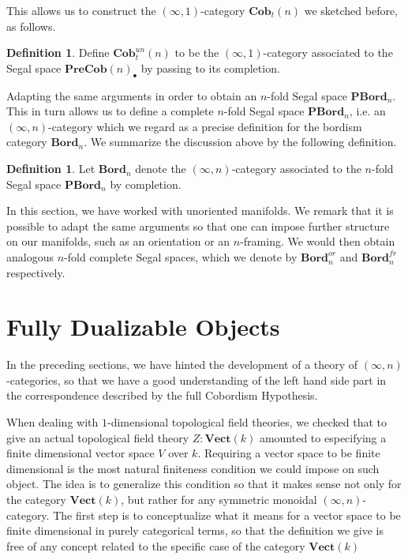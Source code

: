\documentclass[a4paper,11pt]{article}
\newcommand{\vecto}{\mathbf{Vect}}
\theoremstyle{plain}
\theoremstyle{definition}
\newtheorem{defi}[thm]{Definition}
\theoremstyle{remark}
\begin{document}
This allows us to construct the $(\infty, 1)$-category $\textbf{Cob}_t(n)$ we sketched before, as follows. 

\begin{defi}
Define $\textbf{Cob}_t^{un}(n)$ to be the $(\infty, 1)$-category associated to the Segal space $\textbf{PreCob}(n)_{\bullet}$ by passing to its completion. 
\end{defi}

Adapting the same arguments in order to obtain an $n$-fold Segal space $\textbf{PBord}_n$. This in turn allows us to define a complete $n$-fold Segal space $\textbf{PBord}_n$, i.e. an $(\infty, n)$-category which we regard as a precise definition for the bordism category $\textbf{Bord}_n$. We summarize the discussion above by the following definition.

\begin{defi}
Let $\textbf{Bord}_n$ denote the $(\infty, n)$-category associated to the $n$-fold Segal space $\textbf{PBord}_n$ by completion.
\end{defi}


In this section, we have worked with unoriented manifolds. We remark that it is possible to adapt the same arguments so that one can impose further structure on our manifolds, such as an orientation or an $n$-framing. We would then obtain analogous $n$-fold complete Segal spaces, which we denote by $\textbf{Bord}_n^{or}$ and $\textbf{Bord}_n^{fr}$ respectively. 



\section{Fully Dualizable Objects}
\label{section_5}

In the preceding sections, we have hinted the development of a theory of $(\infty, n)$-categories, so that we have a good understanding of the left hand side part in the correspondence described by the full Cobordism Hypothesis. 


When dealing with $1$-dimensional topological field theories, we checked that to give an actual topological field theory $Z \colon \vecto(k)$ amounted to especifying a finite dimensional vector space $V$ over $k$. Requiring a vector space to be finite dimensional is the most natural finiteness condition we could impose on such object. The idea is to generalize this condition so that it makes sense not only for the category $\vecto(k)$, but rather for any symmetric monoidal $(\infty, n)$-category. The first step is to conceptualize what it means for a vector space to be finite dimensional in purely categorical terms, so that the definition we give is free of any concept related to the specific case of the category $\vecto(k)$
\end{document}
